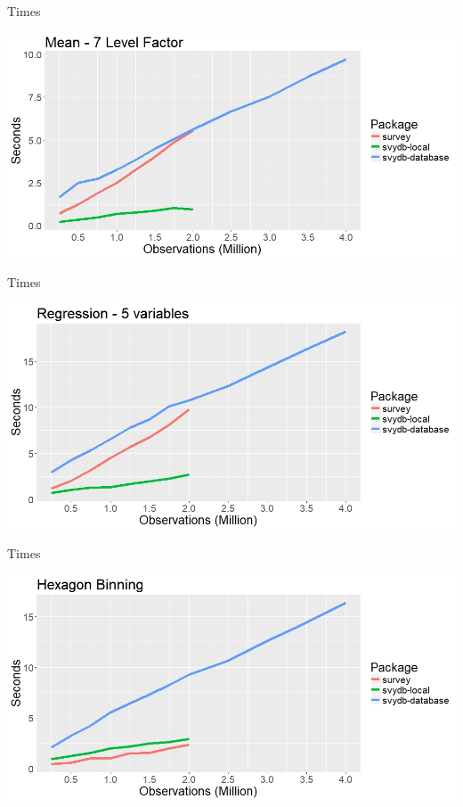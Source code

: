 \documentclass{beamer}
\begin{document}
\begin{frame}{Times}
\begin{center}
    \includegraphics[scale = 0.45]{img/meancat-r.jpeg}
\end{center}
\end{frame}


\begin{frame}{Times}
\begin{center}
    \includegraphics[scale = 0.45]{img/lm-r.jpeg}
\end{center}
\end{frame}



\begin{frame}{Times}
\begin{center}
    \includegraphics[scale = 0.45]{img/hex-r.jpeg}
\end{center}
\end{frame}
\end{document}

